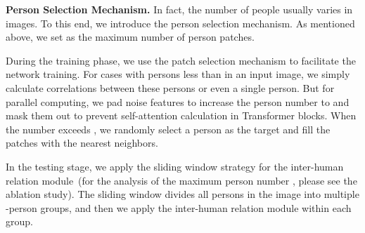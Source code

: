 \documentclass{article}
\begin{document}
\noindent \textbf{Person Selection Mechanism.}
In fact, the number of people usually varies in images. To this end, we introduce the person selection mechanism. As mentioned above, we set  as the maximum number of person patches.  


During the training phase, we use the patch selection mechanism to facilitate the network training. For cases with persons less than  in an input image, we simply calculate correlations between these persons or even a single person. But for parallel computing, we pad noise features to increase the person number to   and mask them out to prevent self-attention calculation in Transformer blocks. When the number exceeds , we randomly select a person as the target and fill the patches with the  nearest neighbors.






In the testing stage, we apply the sliding window strategy for the inter-human relation module~(for the analysis of the maximum person number , please see the ablation study). The sliding window divides all persons in the image into multiple -person groups, and then we apply the inter-human relation module within each group. 
\end{document}
